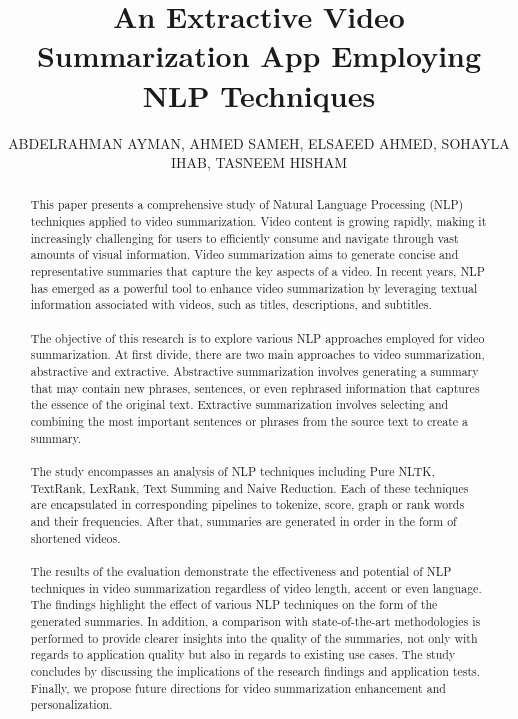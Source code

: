 \documentclass{ieeeaccess}
\begin{document}
\title{An Extractive Video Summarization App Employing NLP Techniques }

\author{\uppercase{Abdelrahman Ayman}, 
\uppercase{Ahmed Sameh}, 
\uppercase{Elsaeed Ahmed}, 
\uppercase{Sohayla Ihab}, 
\uppercase{Tasneem Hisham} 
}
\address[1]{Computer Engineering and Software Systems, Ain Shams University, 19p6458}
\address[2]{Computer Engineering and Software Systems, Ain Shams University, 19p5861}
\address[3]{Computer Engineering and Software Systems, Ain Shams University, 19p1087}
\address[4]{Computer Engineering and Software Systems, Ain Shams University, 19p7343}
\address[5]{Computer Engineering and Software Systems, Ain Shams University, 19p4152}

\begin{abstract}
This paper presents a comprehensive study of Natural Language Processing (NLP) techniques applied to video summarization. Video content is growing rapidly, making it increasingly challenging for users to efficiently consume and navigate through vast amounts of visual information. Video summarization aims to generate concise and representative summaries that capture the key aspects of a video. In recent years, NLP has emerged as a powerful tool to enhance video summarization by leveraging textual information associated with videos, such as titles, descriptions, and subtitles.
\\\\
The objective of this research is to explore various NLP approaches employed for video summarization. At first divide, there are two main approaches to video summarization, abstractive and extractive. 
Abstractive summarization involves generating a summary that may contain new phrases, sentences, or even rephrased information that captures the essence of the original text. Extractive summarization involves selecting and combining the most important sentences or phrases from the source text to create a summary.
\\\\
The study encompasses an analysis of NLP techniques including Pure NLTK, TextRank, LexRank, Text Summing and Naive Reduction. Each of these techniques are encapsulated in corresponding pipelines to tokenize, score, graph or rank words and their frequencies. After that, summaries are generated in order in the form of shortened videos.
\\\\
The results of the evaluation demonstrate the effectiveness and potential of NLP techniques in video summarization regardless of video length, accent or even language. 
The findings highlight the effect of various NLP techniques on the form of the generated summaries. In addition, a comparison with state-of-the-art methodologies is performed to provide clearer insights into the quality of the summaries, not only with regards to application quality but also in regards to existing use cases. The study concludes by discussing the implications of the research findings and application tests. Finally, we propose future directions for video summarization enhancement and personalization.
\end{abstract}
\end{document}
